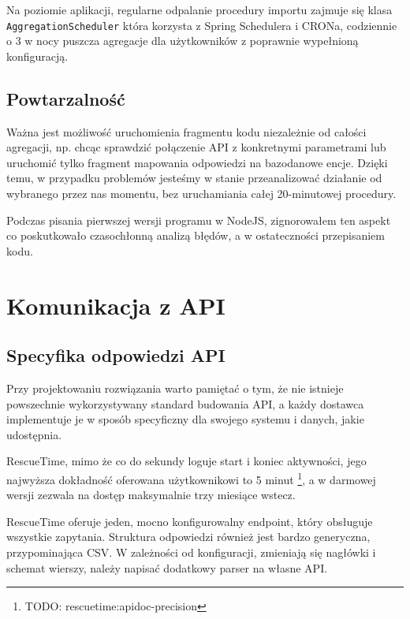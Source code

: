 \documentclass[brudnopis]{xmgr}
\begin{document}
            Na poziomie aplikacji, regularne odpalanie procedury importu zajmuje się klasa \verb|AggregationScheduler|
            która korzysta z Spring Schedulera i CRONa, codziennie o 3 w nocy puszcza agregacje dla użytkowników z poprawnie wypełnioną konfiguracją.

        \subsection*{Powtarzalność}

            Ważna jest możliwość uruchomienia fragmentu kodu niezależnie od całości agregacji, np. chcąc sprawdzić połączenie API z konkretnymi parametrami
            lub uruchomić tylko fragment mapowania odpowiedzi na bazodanowe encje.
            Dzięki temu, w przypadku problemów jesteśmy w stanie przeanalizować działanie od wybranego przez nas momentu,
            bez uruchamiania całej 20-minutowej procedury.

            Podczas pisania pierwszej wersji programu w NodeJS, zignorowałem ten aspekt co poskutkowało czasochłonną analizą błędów,
            a w ostateczności przepisaniem kodu.


    \section{Komunikacja z API}

        \subsection*{Specyfika odpowiedzi API}
            Przy projektowaniu rozwiązania warto pamiętać o tym, że nie istnieje powszechnie wykorzystywany standard budowania API,
            a każdy dostawca implementuje je w sposób specyficzny dla swojego systemu i danych, jakie udostępnia.

            RescueTime, mimo że co do sekundy loguje start i koniec aktywności,
            jego najwyższa dokładność oferowana użytkownikowi to 5 minut \footnote{TODO: rescuetime:apidoc-precision},
            a w darmowej wersji zezwala na dostęp maksymalnie trzy miesiące wstecz.

            RescueTime oferuje jeden, mocno konfigurowalny endpoint, który obsługuje wszystkie zapytania.
            Struktura odpowiedzi również jest bardzo generyczna, przypominająca CSV.
            W zależności od konfiguracji, zmieniają się nagłówki i schemat wierszy, należy napisać dodatkowy parser na własne API.
\end{document}
